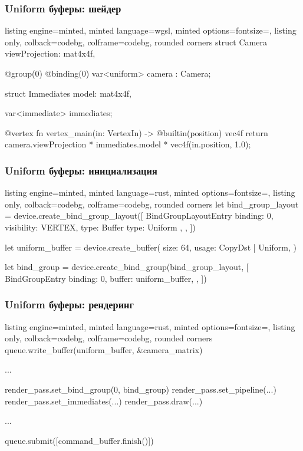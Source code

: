 \documentclass[10pt]{beamer}
\begin{document}
\begin{frame}[fragile]
\frametitle{Uniform буферы: шейдер}
\begin{tcblisting}{listing engine=minted, minted language=wgsl, minted options={fontsize=\scriptsize}, listing only, colback=codebg, colframe=codebg, rounded corners}
struct Camera {
  viewProjection: mat4x4f,
}

@group(0) @binding(0) var<uniform> camera : Camera;

struct Immediates {
  model: mat4x4f,
}

var<immediate> immediates;

@vertex
fn vertex_main(in: VertexIn) -> @builtin(position) vec4f {
  return camera.viewProjection
    * immediates.model
    * vec4f(in.position, 1.0);
}
\end{tcblisting}
\end{frame}

\begin{frame}[fragile]
\frametitle{Uniform буферы: инициализация}
\begin{tcblisting}{listing engine=minted, minted language=rust, minted options={fontsize=\scriptsize}, listing only, colback=codebg, colframe=codebg, rounded corners}
let bind_group_layout = device.create_bind_group_layout([
  BindGroupLayoutEntry {
    binding: 0,
    visibility: VERTEX,
    type: Buffer { type: Uniform },
  },
])

let uniform_buffer = device.create_buffer({
  size: 64,
  usage: CopyDst | Uniform,
})

let bind_group = device.create_bind_group(bind_group_layout, [
  BindGroupEntry {
    binding: 0,
    buffer: uniform_buffer,
  },
])
\end{tcblisting}
\end{frame}

\begin{frame}[fragile]
\frametitle{Uniform буферы: рендеринг}
\begin{tcblisting}{listing engine=minted, minted language=rust, minted options={fontsize=\scriptsize}, listing only, colback=codebg, colframe=codebg, rounded corners}
queue.write_buffer(uniform_buffer, &camera_matrix)

... 

render_pass.set_bind_group(0, bind_group)
render_pass.set_pipeline(...)
render_pass.set_immediates(...)
render_pass.draw(...)

...

queue.submit([command_buffer.finish()])
\end{tcblisting}
\end{frame}
\end{document}
